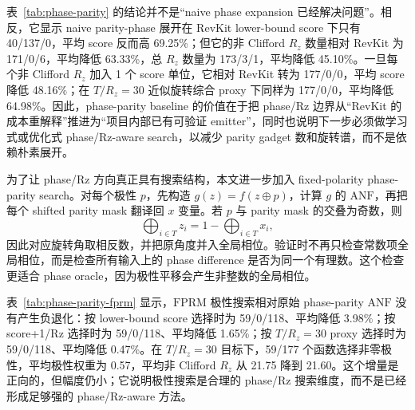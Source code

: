 \documentclass[UTF8,fontset=macnew,11pt]{ctexart}
\newcommand{\anf}{\ensuremath{\mathrm{ANF}}}
\newcommand{\fprm}{\ensuremath{\mathrm{FPRM}}}
\newcommand{\xor}{\ensuremath{\oplus}}
\newcommand{\rz}{\ensuremath{R_z}}
\begin{document}
\begin{table}[H]
\centering
\small
\caption{Phase-parity \anf{} emitter 与 RevKit \texttt{oracle\_synth} 的 phase/Rz 同口径比较。该 emitter 实现 phase oracle up to global phase；lower-bound score 只计 T-like rotations，非 Clifford \rz{} 单独报告。}
\label{tab:phase-parity}

\end{table}

表~\ref{tab:phase-parity} 的结论并不是“naive phase expansion 已经解决问题”。相反，它显示 naive parity-phase 展开在 RevKit lower-bound score 下只有 40/137/0，平均 score 反而高 69.25\%；但它的非 Clifford \rz{} 数量相对 RevKit 为 171/0/6，平均降低 63.33\%，总 \rz{} 数量为 173/3/1，平均降低 45.10\%。一旦每个非 Clifford \rz{} 加入 1 个 score 单位，它相对 RevKit 转为 177/0/0，平均 score 降低 48.16\%；在 $T/R_z=30$ 近似旋转综合 proxy 下同样为 177/0/0，平均降低 64.98\%。因此，phase-parity baseline 的价值在于把 phase/Rz 边界从“RevKit 的成本重解释”推进为“项目内部已有可验证 emitter”，同时也说明下一步必须做学习式或优化式 phase/Rz-aware search，以减少 parity gadget 数和旋转谱，而不是依赖朴素展开。

为了让 phase/Rz 方向真正具有搜索结构，本文进一步加入 fixed-polarity phase-parity search。对每个极性 $p$，先构造 $g(z)=f(z\xor p)$，计算 $g$ 的 \anf{}，再把每个 shifted parity mask 翻译回 $x$ 变量。若 $p$ 与 parity mask 的交叠为奇数，则
\begin{equation}
  \bigoplus_{i\in T} z_i
  =
  1 -
  \bigoplus_{i\in T} x_i ,
\end{equation}
因此对应旋转角取相反数，并把原角度并入全局相位。验证时不再只检查常数项全局相位，而是检查所有输入上的 phase difference 是否为同一个有理数。这个检查更适合 phase oracle，因为极性平移会产生非整数的全局相位。

\begin{table}[H]
\centering
\small
\caption{Fixed-polarity phase-parity search。每个函数枚举全部 $2^n$ 个极性，按 lower-bound score、score+1/Rz 和 $T/R_z=30$ proxy 三个目标分别选择最优极性；共 531 行全部 up-to-global-phase 验证通过。}
\label{tab:phase-parity-fprm}

\end{table}

表~\ref{tab:phase-parity-fprm} 显示，\fprm{} 极性搜索相对原始 phase-parity \anf{} 没有产生负退化：按 lower-bound score 选择时为 59/0/118、平均降低 3.98\%；按 score+1/Rz 选择时为 59/0/118、平均降低 1.65\%；按 $T/R_z=30$ proxy 选择时为 59/0/118、平均降低 0.47\%。在 $T/R_z=30$ 目标下，59/177 个函数选择非零极性，平均极性权重为 0.57，平均非 Clifford \rz{} 从 21.75 降到 21.60。这个增量是正向的，但幅度仍小；它说明极性搜索是合理的 phase/Rz 搜索维度，而不是已经形成足够强的 phase/Rz-aware 方法。
\end{document}
